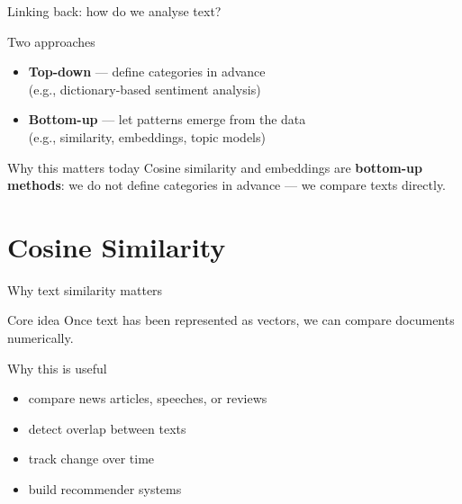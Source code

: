 \documentclass[compress]{beamer}
\begin{document}
\begin{frame}{Linking back: how do we analyse text?}
\begin{block}{Two approaches}
\begin{itemize}
\item<1-> \textbf{Top-down} --- define categories in advance \\
(e.g., dictionary-based sentiment analysis)
\item<2-> \textbf{Bottom-up} --- let patterns emerge from the data \\
(e.g., similarity, embeddings, topic models)
\end{itemize}
\end{block}

\pause

\begin{alertblock}{Why this matters today}
Cosine similarity and embeddings are \textbf{bottom-up methods}: we do not define categories in advance --- we compare texts directly.
\end{alertblock}
\end{frame}

\section{Cosine Similarity}

\begin{frame}{Why text similarity matters}
  \begin{block}{Core idea}
    Once text has been represented as vectors, we can compare documents numerically.
  \end{block}
  \pause
  \begin{exampleblock}{Why this is useful}
    \begin{itemize}[<+>]
      \item compare news articles, speeches, or reviews
      \item detect overlap between texts
      \item track change over time
      \item build recommender systems
    \end{itemize}
  \end{exampleblock}
\end{frame}
\end{document}
